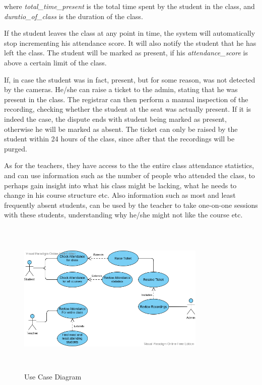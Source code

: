 \documentclass[conference]{IEEEtran}
\begin{document}
where \textit{total\_time\_present} is the total time spent by the student in the class, and \textit{duratio\_of\_class} is the duration of the class.
\par
If the student leaves the class at any point in time, the system will automatically stop incrementing his attendance score. It will also notify the student that he has left the class. The student will be marked as present, if his \textit{attendance\_score} is above a certain limit of the class.
\par
If, in case the student was in fact, present, but for some reason, was not detected by the cameras. He/she can raise a ticket to the admin, stating that he was present in the class. The registrar can then 
perform a manual inspection of the recording, checking whether the student at the seat was actually present. If it is indeed the case, the dispute ends with student being marked as present, otherwise 
he will be marked as absent. The ticket can only be raised by the student within 24 hours of the class, since after that the recordings will be purged.
\par
As for the teachers, they have access to the the entire class attendance statistics, and can use information such as the number of people who attended the class, to perhaps gain insight into what his class might be lacking, what he needs
to change in his course structure etc. Also information such as most and least frequently absent students, can be used by the teacher to take one-on-one sessions with these students, understanding why he/she might not like the course etc.
\begin{figure}[h]
    \centering
    \includegraphics[height=7.5cm,width=9cm]{images/FacialRecogUseCase.png}
    \caption{Use Case Diagram}
    \label{fig:my_label}
\end{figure}
\end{document}
